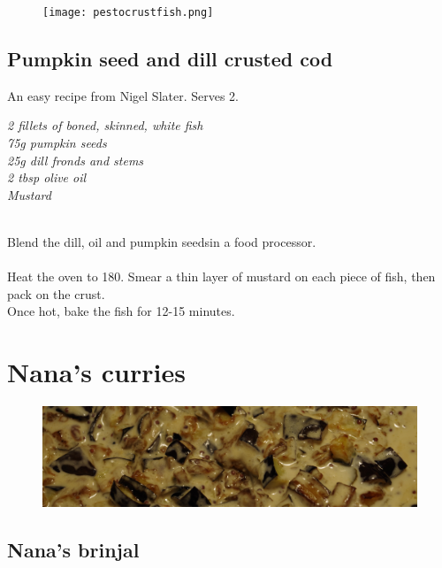 \documentclass{tufte-book}
\begin{document}
\newpage

\begin{figure}[h]
  \texttt{[image: pestocrustfish.png]}%
\end{figure}

\section{Pumpkin seed and dill crusted cod}

An easy recipe from Nigel Slater. Serves 2.

\emph{2 fillets of boned, skinned, white fish
\\75g pumpkin seeds
\\25g dill fronds and stems
\\2 tbsp olive oil
\\Mustard
}

\smallskip
{} 
\\Blend the dill, oil and pumpkin seedsin a food processor.
\\ 
\\Heat the oven to 180\celsius. Smear a thin layer of mustard on each piece of fish, then pack on the crust.
\\ Once hot, bake the fish for 12-15 minutes.

\chapter{Nana's curries}

\begin{figure}[h]
  \includegraphics[width=\linewidth]{eggplantcurry.png}
\end{figure}

\section{Nana's brinjal}
\end{document}
